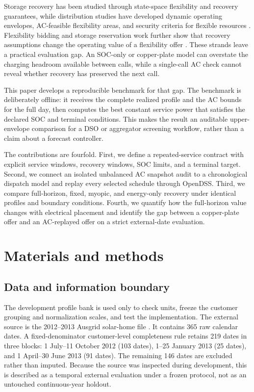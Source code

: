 \documentclass[11pt]{article}
\begin{document}
Storage recovery has been studied through state-space flexibility and recovery guarantees, while distribution studies have developed dynamic operating envelopes, AC-feasible flexibility areas, and security criteria for flexible resources \cite{Evans2022Recovery,Giraldo2023RiskEV,Xiao2025SRC,Lankeshwara2025DOE,Cheng2026FOR}. Flexibility bidding and storage reservation work further show that recovery assumptions change the operating value of a flexibility offer \cite{Wanapinit2022FlexBidding,Wang2026Communication}. These strands leave a practical evaluation gap. An SOC-only or copper-plate model can overstate the charging headroom available between calls, while a single-call AC check cannot reveal whether recovery has preserved the next call.

This paper develops a reproducible benchmark for that gap. The benchmark is deliberately offline: it receives the complete realized profile and the AC bounds for the full day, then computes the best constant service power that satisfies the declared SOC and terminal conditions. This makes the result an auditable upper-envelope comparison for a DSO or aggregator screening workflow, rather than a claim about a forecast controller.

The contributions are fourfold. First, we define a repeated-service contract with explicit service windows, recovery windows, SOC limits, and a terminal target. Second, we connect an isolated unbalanced AC snapshot audit to a chronological dispatch model and replay every selected schedule through OpenDSS. Third, we compare full-horizon, fixed, myopic, and energy-only recovery under identical profiles and boundary conditions. Fourth, we quantify how the full-horizon value changes with electrical placement and identify the gap between a copper-plate offer and an AC-replayed offer on a strict external-date evaluation.

\section{Materials and methods}
\subsection{Data and information boundary}
The development profile bank is used only to check units, freeze the customer grouping and normalization scales, and test the implementation. The external source is the 2012--2013 Ausgrid solar-home file \cite{Ausgrid2011}. It contains 365 raw calendar dates. A fixed-denominator customer-level completeness rule retains 219 dates in three blocks: 1 July--11 October 2012 (103 dates), 1--25 January 2013 (25 dates), and 1 April--30 June 2013 (91 dates). The remaining 146 dates are excluded rather than imputed. Because the source was inspected during development, this is described as a temporal external evaluation under a frozen protocol, not as an untouched continuous-year holdout.
\end{document}
